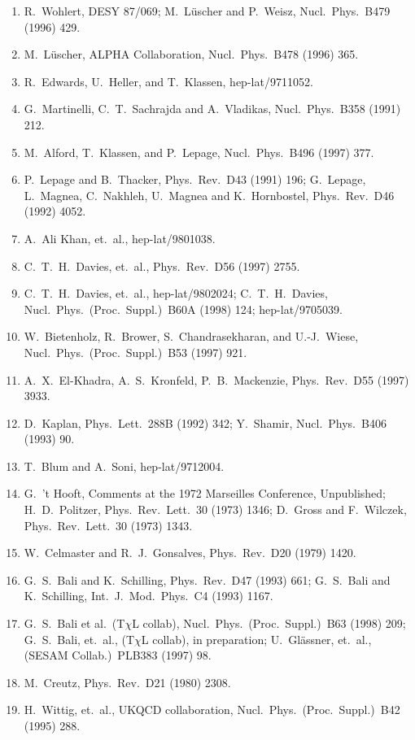 \begin{enumerate}
\item R.~Wohlert, DESY 87/069; M.~L\"uscher and P.~Weisz, Nucl.\ Phys.\ B479 (1996) 429.
\item M.~L\"uscher, ALPHA Collaboration, Nucl.\ Phys.\ B478 (1996) 365.
\item R.~Edwards, U.~Heller, and T.~Klassen, hep-lat/9711052.
\item G.~Martinelli, C.~T.~Sachrajda and A.~Vladikas, Nucl.\ Phys.\ B358 (1991) 212.
\item M.~Alford, T.~Klassen, and P.~Lepage, Nucl.\ Phys.\ B496 (1997) 377.
\item P.~Lepage and B.~Thacker, Phys.\ Rev.\ D43 (1991) 196; G.~Lepage, L.~Magnea, C.~Nakhleh, U.~Magnea and K.~Hornbostel, Phys.\ Rev.\ D46 (1992) 4052.
\item A.~Ali Khan, et.\ al., hep-lat/9801038.
\item C.~T.~H.~Davies, et.\ al., Phys.\ Rev.\ D56 (1997) 2755.
\item C.~T.~H.~Davies, et.\ al., hep-lat/9802024; C.~T.~H.~Davies, Nucl.\ Phys.\ (Proc.\ Suppl.)\ B60A (1998) 124; hep-lat/9705039.
\item W.~Bietenholz, R.~Brower, S.~Chandrasekharan, and U.-J.~Wiese, Nucl.\ Phys.\ (Proc.\ Suppl.)\ B53 (1997) 921.
\item A.~X.~El-Khadra, A.~S.~Kronfeld, P.~B.~Mackenzie, Phys.\ Rev.\ D55 (1997) 3933.
\item D.~Kaplan, Phys.\ Lett.\ 288B (1992) 342; Y.~Shamir, Nucl.\ Phys.\ B406 (1993) 90.
\item T.~Blum and A.~Soni, hep-lat/9712004.
\item G.~'t Hooft, Comments at the 1972 Marseilles Conference, Unpublished; H.~D.~Politzer, Phys.\ Rev.\ Lett.\ 30 (1973) 1346; D.~Gross and F.~Wilczek, Phys.\ Rev.\ Lett.\ 30 (1973) 1343.
\item W.~Celmaster and R.~J.~Gonsalves, Phys.\ Rev.\ D20 (1979) 1420.
\item G.~S.~Bali and K.~Schilling, Phys.\ Rev.\ D47 (1993) 661; G.~S.~Bali and K.~Schilling, Int.\ J.\ Mod.\ Phys.\ C4 (1993) 1167.
\item G.~S.~Bali et al.\ (T$\chi$L collab), Nucl.\ Phys.\ (Proc.\ Suppl.)\ B63 (1998) 209; G.~S.~Bali, et.\ al., (T$\chi$L collab), in preparation; U.~Gl\"assner, et.\ al., (SESAM Collab.)\ PLB383 (1997) 98.
\item M.~Creutz, Phys.\ Rev.\ D21 (1980) 2308.
\item H.~Wittig, et.\ al., UKQCD collaboration, Nucl.\ Phys.\ (Proc.\ Suppl.)\ B42 (1995) 288.

\end{enumerate}
